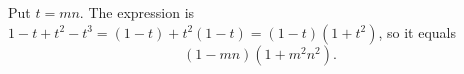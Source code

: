Put $t=mn$. The expression is $1-t+t^2-t^3=(1-t)+t^2(1-t)=(1-t)\left(1+t^2\right)$, so it equals
\[
\boxed{(1-mn)\left(1+m^2n^2\right)}.
\]
